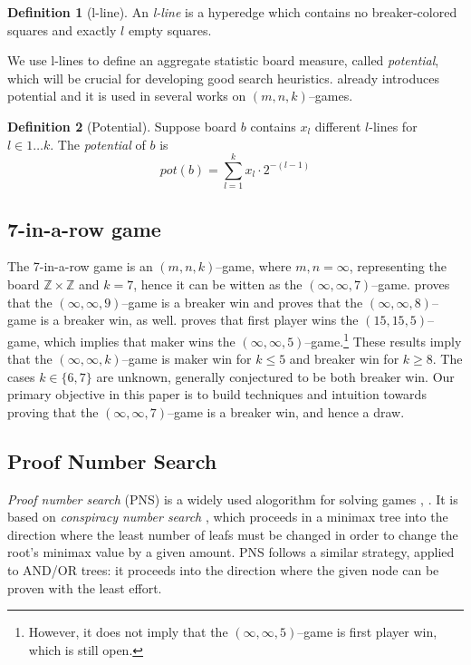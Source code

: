 \documentclass[conference]{IEEEtran}
\theoremstyle{definition}
\newtheorem{definition}{Definition}[section]
\begin{document}
\begin{definition}[l-line]
An \emph{l-line} is a hyperedge which contains no breaker-colored squares and exactly $l$ empty squares.
\end{definition}

We use l-lines to define an aggregate statistic board measure, called \emph{potential}, which will be crucial for developing good search heuristics. \cite{BECK1981117} already introduces potential and it is used in several works on $(m,n,k)$--games.

\begin{definition}[Potential]
Suppose board $b$ contains $x_l$ different $l$-lines for $l \in 1 \dots k$. The \emph{potential} of $b$ is
$$pot(b) = \sum_{l=1}^k x_l \cdot 2^{-(l-1)}$$
\end{definition}


\subsection{7-in-a-row game}
The 7-in-a-row game is an $(m,n,k)$--game, where $m,n=\infty$, representing the board $\mathbb{Z} \times \mathbb{Z}$ and $k=7$, hence it can be witten as the $(\infty,\infty,7)$--game. \cite{BerlekampElwynR1983Wwfy} proves that the $(\infty,\infty,9)$--game is a breaker win and \cite{inf_inf_8} proves that the $(\infty,\infty,8)$--game is a breaker win, as well. \cite{Allis1994SearchingFS} proves that first player wins the $(15,15,5)$--game, which implies that maker wins the $(\infty,\infty,5)$--game.\footnote{However, it does not imply that the $(\infty,\infty,5)$--game is first player win, which is still open.} These results imply that the $(\infty,\infty,k)$--game is maker win for $k \leq 5$ and breaker win for $k \geq 8$. The cases $k \in \{6,7\}$ are unknown, generally conjectured to be both breaker win.
Our primary objective in this paper is to build techniques and intuition towards proving that the $(\infty,\infty,7)$--game is a breaker win, and hence a draw.


\subsection{Proof Number Search}
\emph{Proof number search} (PNS) is a widely used alogorithm for solving games \cite{PNS_base}, \cite{hex_8x8}. It is based on \emph{conspiracy number search} \cite{conspiracy}, which proceeds in a minimax tree into the direction where the least number of leafs must be changed in order to change the root's minimax value by a given amount. PNS follows a similar strategy, applied to AND/OR trees: it proceeds into the direction where the given node can be proven with the least effort.
\end{document}
